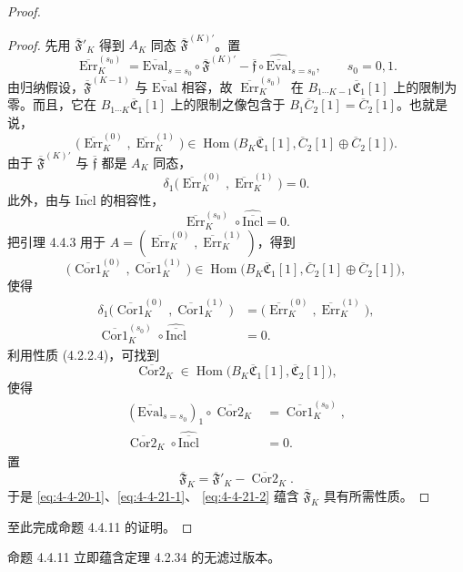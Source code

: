 \begin{proof}
\begin{proof}
先用 $\overline{\mathfrak F}'_K$ 得到 $A_K$ 同态
$\overline{\mathfrak F}^{(K)\prime}$。置
\begin{equation}
 \overline{\operatorname{Err}}_K^{(s_0)}
 =\overline{\mathrm{Eval}}_{s=s_0}
 \circ\overline{\mathfrak F}^{(K)\prime}
 -\overline{\mathfrak f}
 \circ\widehat{\overline{\mathrm{Eval}}}_{s=s_0},
 \qquad s_0=0,1.
\tag{4.4.19}\label{eq:4-4-19}
\end{equation}
由归纳假设，$\overline{\mathfrak F}^{(K-1)}$ 与
$\overline{\mathrm{Eval}}$ 相容，故
$\overline{\operatorname{Err}}_K^{(s_0)}$ 在
$B_{1\cdots K-1}\overline{\mathfrak C}_1[1]$ 上的限制为零。而且，它在
$B_{1\cdots K}\overline{\mathfrak C}_1[1]$ 上的限制之像包含于
$B_1\overline C_2[1]=\overline C_2[1]$。也就是说，
\[
 \bigl(
 \overline{\operatorname{Err}}_K^{(0)},
 \overline{\operatorname{Err}}_K^{(1)}
 \bigr)
 \in\operatorname{Hom}\bigl(
 B_K\overline{\mathfrak C}_1[1],
 \overline C_2[1]\oplus\overline C_2[1]
 \bigr).
\]
由于 $\overline{\mathfrak F}^{(K)\prime}$ 与
$\overline{\mathfrak f}$ 都是 $A_K$ 同态，
\[
 \delta_1\bigl(
 \overline{\operatorname{Err}}_K^{(0)},
 \overline{\operatorname{Err}}_K^{(1)}
 \bigr)=0.
\]
此外，由与 $\overline{\mathrm{Incl}}$ 的相容性，
\[
 \overline{\operatorname{Err}}_K^{(s_0)}
 \circ\widehat{\overline{\mathrm{Incl}}}=0.
\]
把引理 4.4.3 用于
$A=(\overline{\operatorname{Err}}_K^{(0)},
\overline{\operatorname{Err}}_K^{(1)})$，得到
\[
 \bigl(
 \overline{\operatorname{Cor1}}_K^{(0)},
 \overline{\operatorname{Cor1}}_K^{(1)}
 \bigr)
 \in\operatorname{Hom}\bigl(
 B_K\overline{\mathfrak C}_1[1],
 \overline C_2[1]\oplus\overline C_2[1]
 \bigr),
\]
使得
\begin{align}
 \delta_1\bigl(
 \overline{\operatorname{Cor1}}_K^{(0)},
 \overline{\operatorname{Cor1}}_K^{(1)}
 \bigr)
 &=\bigl(
 \overline{\operatorname{Err}}_K^{(0)},
 \overline{\operatorname{Err}}_K^{(1)}
 \bigr),
 \tag{4.4.20.1}\label{eq:4-4-20-1}\\
 \overline{\operatorname{Cor1}}_K^{(s_0)}
 \circ\widehat{\overline{\mathrm{Incl}}}&=0.
 \tag{4.4.20.2}\label{eq:4-4-20-2}
\end{align}
利用性质 (4.2.2.4)，可找到
\[
 \overline{\operatorname{Cor2}}_K
 \in\operatorname{Hom}\bigl(
 B_K\overline{\mathfrak C}_1[1],
 \overline{\mathfrak C}_2[1]
 \bigr),
\]
使得
\begin{align}
 (\overline{\mathrm{Eval}}_{s=s_0})_1
 \circ\overline{\operatorname{Cor2}}_K
 &=\overline{\operatorname{Cor1}}_K^{(s_0)},
 \tag{4.4.21.1}\label{eq:4-4-21-1}\\
 \overline{\operatorname{Cor2}}_K
 \circ\widehat{\overline{\mathrm{Incl}}}&=0.
 \tag{4.4.21.2}\label{eq:4-4-21-2}
\end{align}
置
\[
 \overline{\mathfrak F}_K
 =\overline{\mathfrak F}'_K-\overline{\operatorname{Cor2}}_K.
\]
于是 \eqref{eq:4-4-20-1}、\eqref{eq:4-4-21-1}、
\eqref{eq:4-4-21-2} 蕴含
$\overline{\mathfrak F}_K$ 具有所需性质。
\end{proof}

至此完成命题 4.4.11 的证明。
\end{proof}

命题 4.4.11 立即蕴含定理 4.2.34 的无滤过版本。
